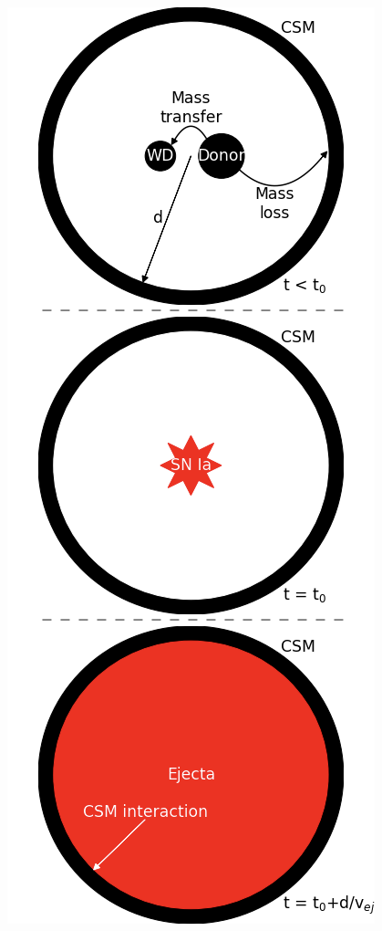\documentclass[a4paper,oneside,12pt, class=Latex/Classes/PhDthesisPSnPDF, crop=false]{standalone}
\begin{document}
\begin{figure}
    \centering
    \includegraphics[height=0.83\textheight]{../Images/chapter_1/CSM_sketch_vert.png}

\end{figure}
\end{document}
